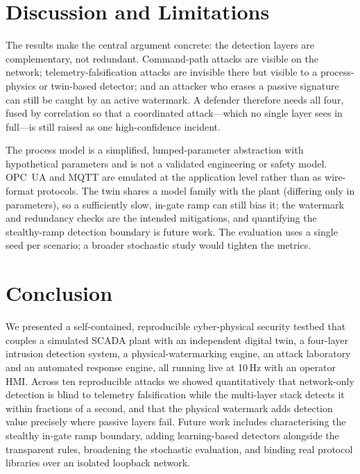 \documentclass[conference]{IEEEtran}
\begin{document}
\section{Discussion and Limitations}
The results make the central argument concrete: the detection layers are complementary, not redundant. Command-path attacks are visible on the network; telemetry-falsification attacks are invisible there but visible to a process-physics or twin-based detector; and an attacker who erases a passive signature can still be caught by an active watermark. A defender therefore needs all four, fused by correlation so that a coordinated attack---which no single layer sees in full---is still raised as one high-confidence incident.

The process model is a simplified, lumped-parameter abstraction with hypothetical parameters and is not a validated engineering or safety model. OPC~UA and MQTT are emulated at the application level rather than as wire-format protocols. The twin shares a model family with the plant (differing only in parameters), so a sufficiently slow, in-gate ramp can still bias it; the watermark and redundancy checks are the intended mitigations, and quantifying the stealthy-ramp detection boundary is future work. The evaluation uses a single seed per scenario; a broader stochastic study would tighten the metrics.

\section{Conclusion}
We presented a self-contained, reproducible cyber-physical security testbed that couples a simulated SCADA plant with an independent digital twin, a four-layer intrusion detection system, a physical-watermarking engine, an attack laboratory and an automated response engine, all running live at 10\,Hz with an operator HMI. Across ten reproducible attacks we showed quantitatively that network-only detection is blind to telemetry falsification while the multi-layer stack detects it within fractions of a second, and that the physical watermark adds detection value precisely where passive layers fail. Future work includes characterising the stealthy in-gate ramp boundary, adding learning-based detectors alongside the transparent rules, broadening the stochastic evaluation, and binding real protocol libraries over an isolated loopback network.
\end{document}
